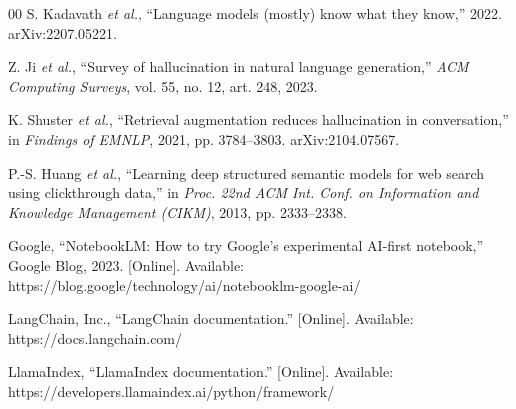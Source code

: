 \documentclass[conference]{IEEEtran}
\begin{document}
\begin{thebibliography}{00}
 S. Kadavath \emph{et al.}, ``Language models (mostly) know what they know,'' 2022. arXiv:2207.05221.

 Z. Ji \emph{et al.}, ``Survey of hallucination in natural language generation,'' \emph{ACM Computing Surveys}, vol. 55, no. 12, art. 248, 2023.

 K. Shuster \emph{et al.}, ``Retrieval augmentation reduces hallucination in conversation,'' in \emph{Findings of EMNLP}, 2021, pp. 3784--3803. arXiv:2104.07567.

 P.-S. Huang \emph{et al.}, ``Learning deep structured semantic models for web search using clickthrough data,'' in \emph{Proc. 22nd ACM Int. Conf. on Information and Knowledge Management (CIKM)}, 2013, pp. 2333--2338.

 Google, ``NotebookLM: How to try Google's experimental AI-first notebook,'' Google Blog, 2023. [Online]. Available: https://blog.google/technology/ai/notebooklm-google-ai/

 LangChain, Inc., ``LangChain documentation.'' [Online]. Available: https://docs.langchain.com/

 LlamaIndex, ``LlamaIndex documentation.'' [Online]. Available: https://developers.llamaindex.ai/python/framework/

\end{thebibliography}
\end{document}
